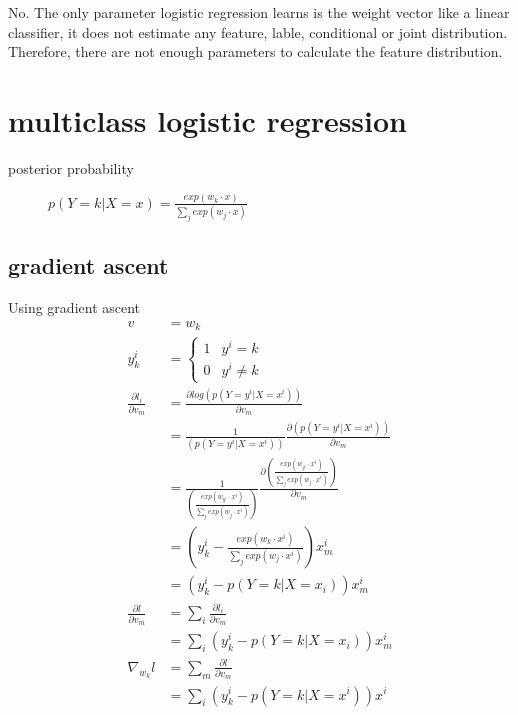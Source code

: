 \documentclass[12pt]{article}
\begin{document}
\begin{multicols}{2}
  No. The only parameter logistic regression learns is the weight vector like a linear classifier, it does not estimate any feature, lable, conditional or joint distribution. Therefore, there are not enough parameters to calculate the feature distribution.

  \section{multiclass logistic regression}
  \begin{description}
  \item[posterior probability] $p(Y=k|X=x) = \frac{exp(w_k \cdot x)} { \sum_j exp(w_j \cdot x)}$
  \end{description}
  \subsection{gradient ascent}
  Using gradient ascent
  \begin{align*}
    v
    &= w_k \\
    y_k^i &=
    \begin{cases}
      1 & y^i = k \\
      0 & y^i \neq k
    \end{cases} \\
    \frac {\partial l_i} {\partial v_m}
    &= \frac {\partial log (p(Y=y^i|X=x^i))}{\partial v_m} \\
    &= \frac{1}{(p(Y=y^i|X=x^i))} \frac {\partial (p(Y=y^i|X=x^i))}{\partial v_m} \\
    &= \frac{1}{(\frac{exp(w_{y^i} \cdot {x^i})} { \sum_j exp(w_j \cdot {x^i})})} \frac {\partial (\frac{exp(w_{y^i} \cdot {x^i})} { \sum_j exp(w_j \cdot {x^i})})}{\partial v_m} \\
    &= (y_k^i - \frac{exp(w_k \cdot x^i)} { \sum_j exp(w_j \cdot x^i)}) x_m^i \\
    &= (y_k^i - p(Y=k|X=x_i)) x_m^i \\
    \frac {\partial l} {\partial v_m}
    &= \sum_i \frac {\partial l_i} {\partial v_m} \\
    &= \sum_i (y_k^i - p(Y=k|X=x_i)) x_m^i \\
    \nabla_{w_k} l
    &= \sum_m \frac{\partial l}{\partial {v_m}} \\
    &= \sum_i (y_k^i - p(Y=k|X=x^i))x^i
  \end{align*}

\end{multicols}
\end{document}
